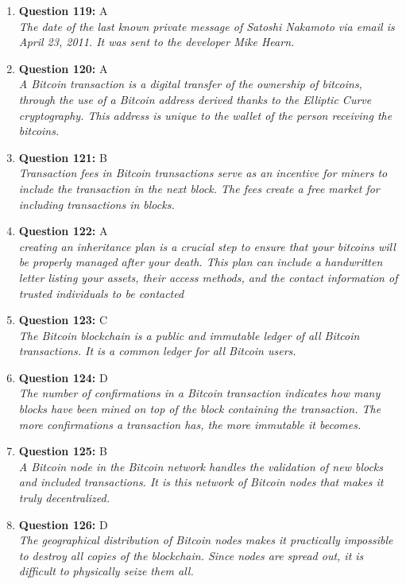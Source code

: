 \documentclass[12pt,a4paper]{article}
\begin{document}
\begin{enumerate}
\item \textbf{Question 119:} A
\\ \textit{The date of the last known private message of Satoshi Nakamoto via email is April 23, 2011. It was sent to the developer Mike Hearn.}

\item \textbf{Question 120:} A
\\ \textit{A Bitcoin transaction is a digital transfer of the ownership of bitcoins, through the use of a Bitcoin address derived thanks to the Elliptic Curve cryptography. This address is unique to the wallet of the person receiving the bitcoins.}

\item \textbf{Question 121:} B
\\ \textit{Transaction fees in Bitcoin transactions serve as an incentive for miners to include the transaction in the next block. The fees create a free market for including transactions in blocks.}

\item \textbf{Question 122:} A
\\ \textit{creating an inheritance plan is a crucial step to ensure that your bitcoins will be properly managed after your death. This plan can include a handwritten letter listing your assets, their access methods, and the contact information of trusted individuals to be contacted}

\item \textbf{Question 123:} C
\\ \textit{The Bitcoin blockchain is a public and immutable ledger of all Bitcoin transactions. It is a common ledger for all Bitcoin users.}

\item \textbf{Question 124:} D
\\ \textit{The number of confirmations in a Bitcoin transaction indicates how many blocks have been mined on top of the block containing the transaction. The more confirmations a transaction has, the more immutable it becomes.}

\item \textbf{Question 125:} B
\\ \textit{A Bitcoin node in the Bitcoin network handles the validation of new blocks and included transactions. It is this network of Bitcoin nodes that makes it truly decentralized.}

\item \textbf{Question 126:} D
\\ \textit{The geographical distribution of Bitcoin nodes makes it practically impossible to destroy all copies of the blockchain. Since nodes are spread out, it is difficult to physically seize them all.}


\end{enumerate}
\end{document}

